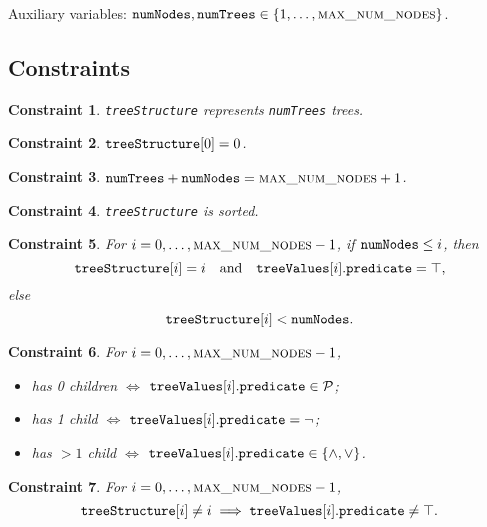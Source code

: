 \documentclass{article}
\newtheorem{constraint}{Constraint}
\theoremstyle{definition}
\newcommand{\variable}[1]{\texttt{\textup{#1}}}
\newcommand{\predicates}{\mathcal{P}}
\newcommand{\maxNumNodes}{\textsc{max\_num\_nodes}}
\begin{document}
Auxiliary variables: $\variable{numNodes}, \variable{numTrees} \in \{ 1, \dots,
\maxNumNodes{} \}$.

\subsection{Constraints}

\begin{constraint}
  \variable{treeStructure} represents \variable{numTrees} trees.
\end{constraint}

\begin{constraint}
  $\variable{treeStructure}[0] = 0$.
\end{constraint}

\begin{constraint}
  $\variable{numTrees} + \variable{numNodes} = \maxNumNodes{} + 1$.
\end{constraint}

\begin{constraint}
  \variable{treeStructure} is sorted.
\end{constraint}

\begin{constraint}
  For $i = 0, \dots, \maxNumNodes{} - 1$, if $\variable{numNodes} \le
  i$, then
  \[
    \variable{treeStructure}[i] = i \quad \text{and} \quad
    \variable{treeValues}[i].\variable{predicate} = \top,
  \]
  else
  \[
    \variable{treeStructure}[i] < \variable{numNodes}.
  \]
\end{constraint}

\begin{constraint}
  For $i = 0, \dots, \maxNumNodes{} - 1$,
  \begin{itemize}
  \item has 0 children $\iff$ $\variable{treeValues}[i].\variable{predicate} \in
    \predicates{}$;
  \item has 1 child $\iff$ $\variable{treeValues}[i].\variable{predicate} = \neg$;
  \item has $>1$ child $\iff$ $\variable{treeValues}[i].\variable{predicate} \in
    \{ \land, \lor \}$.
  \end{itemize}
\end{constraint}

\begin{constraint}
  For $i = 0, \dots, \maxNumNodes{} - 1$,
  \[
    \variable{treeStructure}[i] \ne i \implies
    \variable{treeValues}[i].\variable{predicate} \ne \top.
  \]
\end{constraint}
\end{document}
